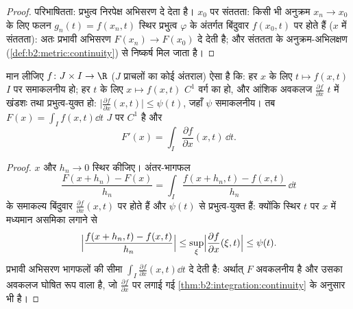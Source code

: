 \begin{proof}
परिभाषितता: प्रभुत्व निरपेक्ष अभिसरण दे देता है। $x_0$ पर संततता: किसी भी
अनुक्रम $x_n \to x_0$ के लिए फलन $g_n(t) =
f(x_n, t)$ स्थिर प्रभुत्व $\varphi$ के अंतर्गत बिंदुवार $f(x_0, t)$
पर  होते हैं ($x$ में संततता): अतः प्रभावी अभिसरण $F(x_n) \to F(x_0)$ दे देती है;
और संततता के अनुक्रम-अभिलक्षण (\cref{def:b2:metric:continuity}) से निष्कर्ष मिल जाता है।
\end{proof}

\begin{theorem}[समाकल-चिह्न के भीतर अवकलन]\label{thm:b2:integration:leibnizrule}
मान लीजिए $f \colon J \times I \to \R$ ($J$ प्राचलों का कोई अंतराल) ऐसा है कि: हर $x$ के लिए $t \mapsto f(x,t)$
$I$ पर समाकलनीय हो; हर $t$ के लिए $x \mapsto
f(x,t)$ $C^1$ वर्ग का हो, और आंशिक अवकलज
$\frac{\partial f}{\partial x}$ $t$ में खंडशः  तथा प्रभुत्व-युक्त हो: $\bigl|\frac{\partial f}{\partial x}(x,t)\bigr| \leq
\psi(t)$, जहाँ $\psi$
समाकलनीय। तब $F(x) = \int_I f(x,t)\dd t$ $J$ पर $C^1$ है और
\[
F'(x) = \int_I \frac{\partial f}{\partial x}(x, t)\,\dd t .
\]
\end{theorem}

\begin{proof}
$x$ और $h_n \to 0$ स्थिर कीजिए। अंतर-भागफल
\[
\frac{F(x + h_n) - F(x)}{h_n}
= \int_I \frac{f(x + h_n, t) - f(x, t)}{h_n}\,\dd t
\]
के समाकल्य बिंदुवार $\frac{\partial f}{\partial
x}(x, t)$ पर  होते हैं और $\psi(t)$ से प्रभुत्व-युक्त
हैं: क्योंकि स्थिर $t$ पर $x$ में मध्यमान असमिका लगाने से
\[
\Bigl|\frac{f(x + h_n, t) - f(x,t)}{h_n}\Bigr|
\leq \sup_{\xi} \Bigl|\frac{\partial f}{\partial x}(\xi, t)\Bigr|
\leq \psi(t) .
\]
प्रभावी अभिसरण भागफलों की सीमा $\int_I \frac{\partial
f}{\partial x}(x,t)\dd t$ दे देती है: अर्थात् $F$ अवकलनीय है और
उसका अवकलज घोषित रूप वाला है, जो $\frac{\partial
f}{\partial x}$ पर लगाई गई \cref{thm:b2:integration:continuity} के अनुसार  भी
है।
\end{proof}

